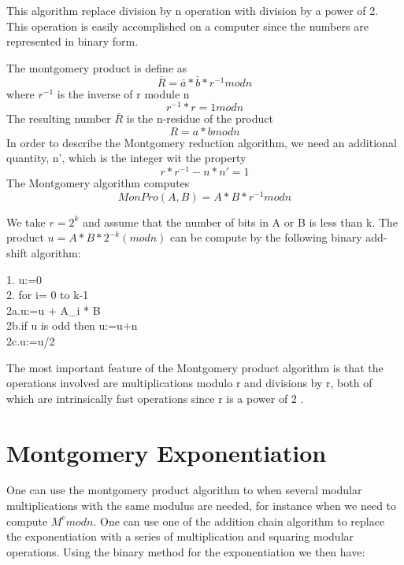 This algorithm replace division by n operation with division by a power of 2. This operation is easily accomplished on a computer since the numbers are represented in binary form\cite{highspeedrsa}.

The montgomery product is define as
\begin{equation}
    \bar{R}= \bar{a} * \bar{b} * r^{-1} mod n
\end{equation}
where $r^{-1}$ is the inverse of r module n
\begin{equation}
    r^{-1}*r = 1 mod n
\end{equation}
The resulting number $\bar{R}$ is the n-residue of the product
\begin{equation}
    R= a * b mod n
\end{equation}
In order to describe the Montgomery reduction algorithm, we need an additional quantity, n', which is the integer wit the property 
\begin{equation}
    r * r^{-1} - n * n' =1
\end{equation}
The Montgomery algorithm computes
\begin{equation}
    MonPro(A,B) = A * B * r^{-1}mod n
\end{equation}

We take $r=2^k$ and assume that the number of bits in A or B is less than k. The product $u = A * B * 2^{-k}(mod n)$ can be compute by the following binary add-shift algorithm:\\
\begin{algorithm}[H]

    1. u:=0\\
    2. for i= 0 to k-1\\
    2a.\quad u:=u + A_i * B\\
    2b.\quad if u is odd then u:=u+n\\
    2c.\quad u:=u/2\\
\end{algorithm}
The most important feature of the Montgomery product algorithm is that the operations involved are multiplications modulo r and divisions by r, both of which are intrinsically fast operations since r is a power of 2 \cite{highspeedrsa}.


\section{Montgomery Exponentiation}
One can use the montgomery product algorithm to when several modular multiplications with the same modulus are needed, for instance when we need to compute $M^e mod n$. One can use one of the addition chain algorithm to replace the exponentiation with a series of multiplication and squaring modular operations. Using the binary method for the exponentiation we then have:

